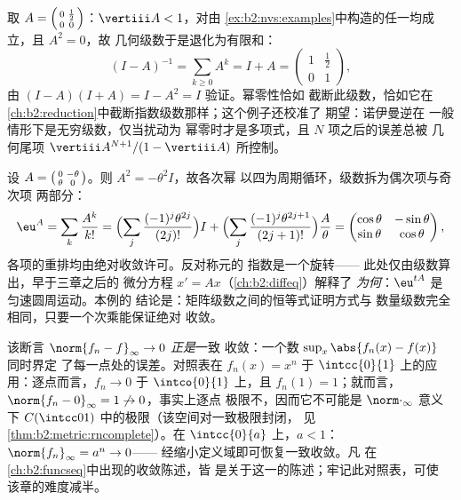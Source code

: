 \begin{example}[终止的诺伊曼级数]\label{ex:b2:nvs:neumannfinite}
取 $A = \begin{psmallmatrix}0 & \frac12\\ 0 &
0\end{psmallmatrix}$：$\vertiii A < 1$，对由
\cref{ex:b2:nvs:examples}中构造的任一均成立，且 $A^2 = 0$，故
几何级数于是退化为有限和：
\[
(I - A)^{-1} = \sum_{k \geq 0} A^k = I + A =
\begin{pmatrix}1 & \tfrac12\\ 0 & 1\end{pmatrix},
\]
由 $(I - A)(I + A) = I - A^2 = I$ 验证。幂零性恰如
截断此级数，恰如它在
\cref{ch:b2:reduction}中截断指数级数那样；这个例子还校准了
期望：诺伊曼逆在
一般情形下是无穷级数，仅当扰动为
幂零时才是多项式，且 $N$ 项之后的误差总被
几何尾项 $\vertiii A^{N+1}/(1 - \vertiii A)$ 所控制。
\end{example}

\begin{example}[旋转生成元的指数]\label{ex:b2:nvs:rotationexp}
设 $A = \begin{psmallmatrix}0 & -\theta\\ \theta &
0\end{psmallmatrix}$。则 $A^2 = -\theta^2 I$，故各次幂
以四为周期循环，级数拆为偶次项与奇次项
两部分：
\[
\eu^{A} = \sum_{k}\frac{A^k}{k!}
= \Bigl(\sum_{j}\frac{(-1)^j\theta^{2j}}{(2j)!}\Bigr) I
+ \Bigl(\sum_{j}\frac{(-1)^j\theta^{2j+1}}{(2j+1)!}\Bigr)
\frac{A}{\theta}
= \begin{pmatrix}
\cos\theta & -\sin\theta\\
\sin\theta & \cos\theta
\end{pmatrix},
\]
各项的重排均由绝对收敛许可。反对称元的
指数是一个旋转——
此处仅由级数算出，早于三章之后的
微分方程 $x' = Ax$（\cref{ch:b2:diffeq}）解释了
\emph{为何}：$\eu^{tA}$ 是匀速圆周运动。本例的
结论是：矩阵级数之间的恒等式证明方式与
数量级数完全相同，只要一个次乘能保证绝对
收敛。
\end{example}

\begin{example}\label{ex:b2:nvs:uniformdictionary}
该断言 $\norm{f_n - f}_\infty \to 0$ \emph{正是}一致
收敛：一个数 $\sup_x\abs{f_n(x) - f(x)}$ 同时界定
了每一点处的误差。对照表在
$f_n(x) = x^n$ 于 $\intcc{0}{1}$ 上的应用：逐点而言，$f_n
\to 0$ 于 $\intco{0}{1}$ 上，且 $f_n(1) = 1$；就而言，
$\norm{f_n - 0}_\infty = 1 \not\to 0$，事实上逐点
极限不，因而它不可能是
$\norm\cdot_\infty$ 意义下 $C(\intcc01)$ 中的极限（该空间对一致极限封闭，
见\cref{thm:b2:metric:rncomplete}）。在
$\intcc{0}{a}$ 上，$a < 1$：$\norm{f_n}_\infty = a^n \to 0$——
经缩小定义域即可恢复一致收敛。凡
在\cref{ch:b2:funcseq}中出现的收敛陈述，皆
是关于这一的陈述；牢记此对照表，可使
该章的难度减半。
\end{example}

